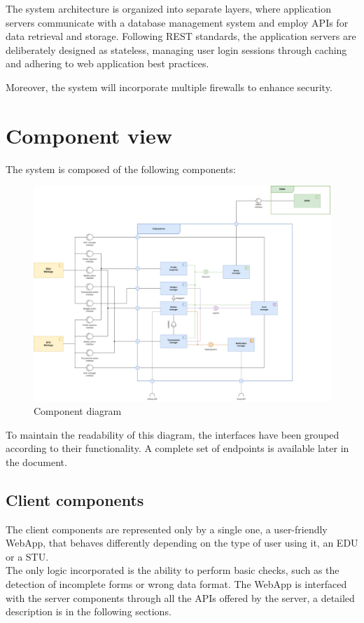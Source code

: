 The system architecture is organized into separate layers, where application servers communicate with a database management system and employ APIs for data retrieval and storage.
Following REST standards, the application servers are deliberately designed as stateless, managing user login sessions through caching and adhering to web application best practices.

Moreover, the system will incorporate multiple firewalls to enhance security.

\section{Component view}

The system is composed of the following components:

\begin{figure}[H]
    \centering
    \includegraphics[width=\textwidth]{images/diagrams/component_diagram.png}
    \caption{Component diagram}
\end{figure}

To maintain the readability of this diagram, the interfaces have been grouped according to their functionality.
A complete set of endpoints is available later in the document.

\subsection{Client components}
The client components are represented only by a single one, a user-friendly WebApp, that behaves differently depending on the type of user using it, an EDU or a STU. \\
The only logic incorporated is the ability to perform basic checks, such as the detection of incomplete forms or wrong data format.
The WebApp is interfaced with the server components through all the APIs offered by the server, a detailed description is in the following sections.
